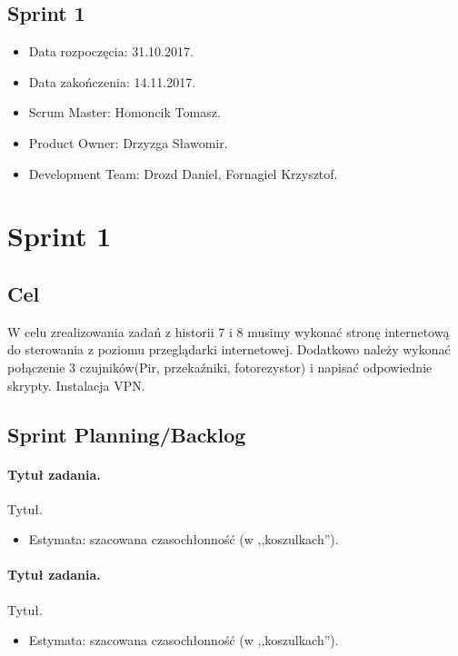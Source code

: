 	\subsection{Sprint 1}
	
	\begin{itemize}
		\item Data rozpoczęcia: 31.10.2017.
		\item Data zakończenia: 14.11.2017.
		\item Scrum Master: Homoncik Tomasz.
		\item Product Owner: Drzyzga Sławomir.
		\item Development Team: Drozd Daniel, Fornagiel Krzysztof.
	\end{itemize}
	
	\section{Sprint 1}
	\subsection{Cel} 

	
	W celu zrealizowania zadań z historii 7 i 8 musimy wykonać stronę internetową do sterowania z poziomu przeglądarki internetowej. Dodatkowo należy wykonać połączenie 3 czujników(Pir, przekaźniki, fotorezystor) i napisać odpowiednie skrypty. Instalacja VPN.
	
	
	
	\subsection{Sprint Planning/Backlog}
	
	\paragraph{Tytuł zadania.} Tytuł.
	\begin{itemize}
		\item Estymata: szacowana czasochłonność (w ,,koszulkach'').
	\end{itemize}
	
	\paragraph{Tytuł zadania.} Tytuł.
	\begin{itemize}
		\item Estymata: szacowana czasochłonność (w ,,koszulkach'').
	\end{itemize}
	
